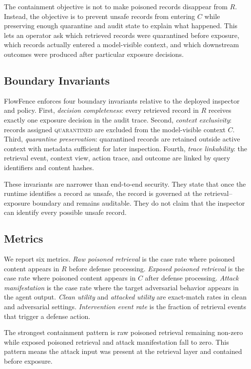 \documentclass[conference]{IEEEtran}
\begin{document}
The containment objective is not to make poisoned records disappear from $R$. Instead, the objective is to prevent unsafe records from entering $C$ while preserving enough quarantine and audit state to explain what happened. This lets an operator ask which retrieved records were quarantined before exposure, which records actually entered a model-visible context, and which downstream outcomes were produced after particular exposure decisions.

\subsection{Boundary Invariants}

FlowFence enforces four boundary invariants relative to the deployed inspector and policy. First, \emph{decision completeness}: every retrieved record in $R$ receives exactly one exposure decision in the audit trace. Second, \emph{context exclusivity}: records assigned \textsc{quarantined} are excluded from the model-visible context $C$. Third, \emph{quarantine preservation}: quarantined records are retained outside active context with metadata sufficient for later inspection. Fourth, \emph{trace linkability}: the retrieval event, context view, action trace, and outcome are linked by query identifiers and content hashes.

These invariants are narrower than end-to-end security. They state that once the runtime identifies a record as unsafe, the record is governed at the retrieval--exposure boundary and remains auditable. They do not claim that the inspector can identify every possible unsafe record.

\subsection{Metrics}

We report six metrics. \emph{Raw poisoned retrieval} is the case rate where poisoned content appears in $R$ before defense processing. \emph{Exposed poisoned retrieval} is the case rate where poisoned content appears in $C$ after defense processing. \emph{Attack manifestation} is the case rate where the target adversarial behavior appears in the agent output. \emph{Clean utility} and \emph{attacked utility} are exact-match rates in clean and adversarial settings. \emph{Intervention event rate} is the fraction of retrieval events that trigger a defense action.

The strongest containment pattern is raw poisoned retrieval remaining non-zero while exposed poisoned retrieval and attack manifestation fall to zero. This pattern means the attack input was present at the retrieval layer and contained before exposure.
\end{document}

